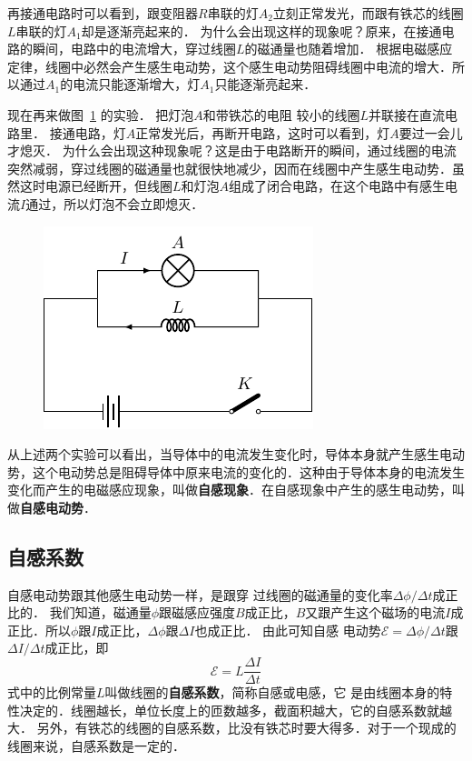 再接通电路时可以看到，跟变阻器$R$串联的灯$A_2$立刻正常发光，而跟有铁芯的线圈$L$串联的灯$A_1$却是逐渐亮起来的．
为什么会出现这样的现象呢？原来，在接通电路的瞬间，电路中的电流增大，穿过线圈$L$的磁通量也随着增加．
根据电磁感应定律，线圈中必然会产生感生电动势，这个感生电动势阻碍线圈中电流的增大．所以通过$A_1$的电流只能逐渐增大，灯$A_1$只能逐渐亮起来．


现在再来做图~\ref{fig_C_2-26} 的实验．
把灯泡$A$和带铁芯的电阻
较小的线圈$L$并联接在直流电路里．
接通电路，灯$A$正常发光后，再断开电路，这时可以看到，灯$A$要过一会儿才熄灭．
为什么会出现这种现象呢？这是由于电路断开的瞬间，通过线圈的电流突然减弱，穿过线圈的磁通量也就很快地减少，因而在线圈中产生感生电动势．虽然这时电源已经断开，但线圈$L$和灯泡$A$组成了闭合电路，在这个电路中有感生电流$I$通过，所以灯泡不会立即熄灭．
\begin{figure}[htbp]
	\centering
	\includegraphics{fig/C/2-26.pdf}
	\caption{}\label{fig_C_2-26}
\end{figure}


从上述两个实验可以看出，当导体中的电流发生变化时，导体本身就产生感生电动势，这个电动势总是阻碍导体中原来电流的变化的．这种由于导体本身的电流发生变化而产生的电磁感应现象，叫做\textbf{自感现象}．在自感现象中产生的感生电动势，叫做\textbf{自感电动势}．

\subsection{自感系数}
自感电动势跟其他感生电动势一样，是跟穿
过线圈的磁通量的变化率$\Delta\phi/\Delta t$成正比的．
我们知道，磁通量$\phi$跟磁感应强度$B$成正比，$B$又跟产生这个磁场的电流$I$成正比．所以$\phi$跟$I$成正比，$\Delta \phi$跟$\Delta I$也成正比．
由此可知自感
电动势$\mathcal{E}=\Delta\phi/\Delta t$跟$\Delta I/\Delta t$成正比，即
\[\mathcal{E}=L\frac{\Delta I}{\Delta t}\]
式中的比例常量$L$叫做线圈的\textbf{自感系数}，简称自感或电感，它
是由线圈本身的特性决定的．线圈越长，单位长度上的匝数越多，截面积越大，它的自感系数就越大．
另外，有铁芯的线圈的自感系数，比没有铁芯时要大得多．对于一个现成的线圈来说，自感系数是一定的．

